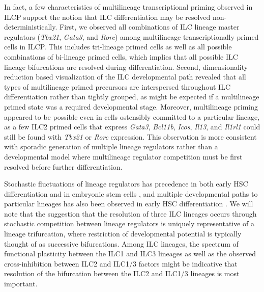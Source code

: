 In fact, a few characteristics of multilineage transcriptional priming observed in ILCP support the notion that ILC differentiation may be resolved non-deterministically. First, we observed all combinations of ILC lineage master regulators (\textit{Tbx21}, \textit{Gata3}, and \textit{Rorc}) among multilineage transcriptionally primed cells in ILCP. This includes tri-lineage primed cells as well as all possible combinations of bi-lineage primed cells, which implies that all possible ILC lineage bifurcations are resolved during differentiation. Second, dimensionality reduction based visualization of the ILC developmental path revealed that all types of multilineage primed precursors are interspersed throughout ILC differentiation rather than tightly grouped, as might be expected if a multilineage primed state was a required developmental stage. Moreover, multilineage priming appeared to be possible even in cells ostensibly committed to a particular lineage, as a few ILC2 primed cells that express \textit{Gata3}, \textit{Bcl11b}, \textit{Icos}, \textit{Il13}, and \textit{Il1rl1} could still be found with \textit{Tbx21} or \textit{Rorc} expression. This observation is more consistent with sporadic generation of multiple lineage regulators rather than a developmental model where multilineage regulator competition must be first resolved before further differentiation. 

Stochastic fluctuations of lineage regulators has precedence in both early HSC differentiation and in embryonic stem cells \cite{pina2012,abranches2014}, and multiple developmental paths to particular lineages has also been observed in early HSC differentiation \cite{pina2012,notta2016,laslo2006}. We will note that the suggestion that the resolution of three ILC lineages occurs through stochastic competition between lineage regulators is uniquely representative of a lineage trifurcation, where restriction of developmental potential is typically thought of as successive bifurcations. Among ILC lineages, the spectrum of functional plasticity between the ILC1 and ILC3 lineages as well as the observed cross-inhibition between ILC2 and ILC1/3 factors might be indicative that resolution of the bifurcation between the ILC2 and ILC1/3 lineages is most important.

